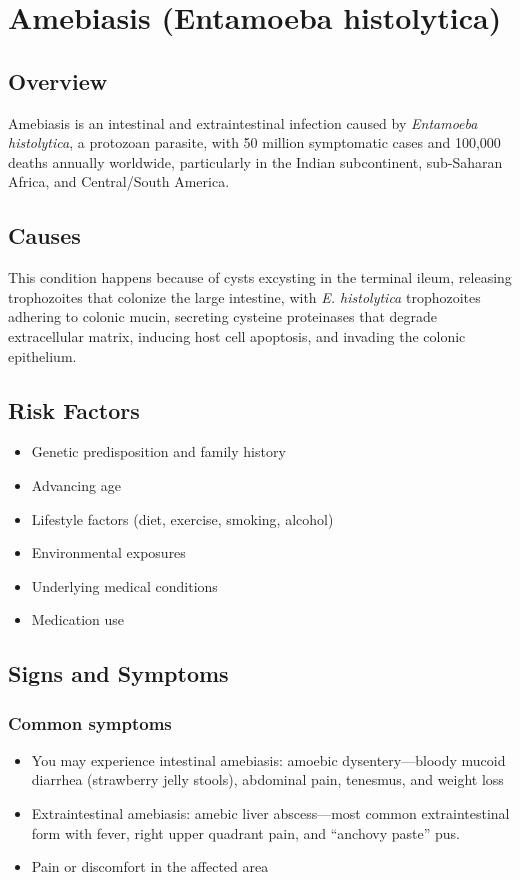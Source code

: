 \chapter{Amebiasis (Entamoeba histolytica)}
\label{sec:Amebiasis}

\section{Overview}
Amebiasis is an intestinal and extraintestinal infection caused by \textit{Entamoeba histolytica}, a protozoan parasite, with 50 million symptomatic cases and 100,000 deaths annually worldwide, particularly in the Indian subcontinent, sub-Saharan Africa, and Central/South America.
\section{Causes}
This condition happens because of cysts excysting in the terminal ileum, releasing trophozoites that colonize the large intestine, with \textit{E. histolytica} trophozoites adhering to colonic mucin, secreting cysteine proteinases that degrade extracellular matrix, inducing host cell apoptosis, and invading the colonic epithelium.     
\section{Risk Factors}

\begin{itemize}[noitemsep]
  \item Genetic predisposition and family history
  \item Advancing age
  \item Lifestyle factors (diet, exercise, smoking, alcohol)
  \item Environmental exposures
  \item Underlying medical conditions
  \item Medication use
\end{itemize}
\section{Signs and Symptoms}

\subsection{Common symptoms}
\begin{itemize}[noitemsep]
  \item You may experience intestinal amebiasis: amoebic dysentery---bloody mucoid diarrhea (strawberry jelly stools), abdominal pain, tenesmus, and weight loss
  \item Extraintestinal amebiasis: amebic liver abscess---most common extraintestinal form with fever, right upper quadrant pain, and ``anchovy paste'' pus.
  \item Pain or discomfort in the affected area
  \end{itemize}

